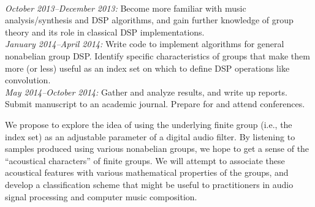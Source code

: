 \documentclass{article}
\begin{document}
\vskip5mm

\\
{\it October 2013--December 2013:} Become more familiar with music
analysis/synthesis and \ac{DSP} algorithms, and gain further knowledge of group
theory and its role in classical \ac{DSP} implementations. 
\\[5pt]
{\it January 2014--April 2014:} Write code to implement algorithms for
general nonabelian group \ac{DSP}.  
Identify specific characteristics of groups that make them more (or less)
useful as an index set on which to define \ac{DSP} operations like convolution.
\\[5pt]
{\it May 2014--October 2014:} Gather and analyze results, and write up reports.  
Submit manuscript to an academic journal.  Prepare
for and attend conferences.

\vskip5mm


We propose to explore the idea of using the underlying finite group (i.e., the
index set) as an adjustable parameter of a digital audio filter.  By listening to
samples produced using various nonabelian groups, we hope to get a sense of the
``acoustical characters'' of finite groups.  We will attempt to associate these
acoustical features with various mathematical properties of the groups, and
develop a classification scheme that might be useful to
practitioners in audio signal processing and computer music composition.
\end{document}
